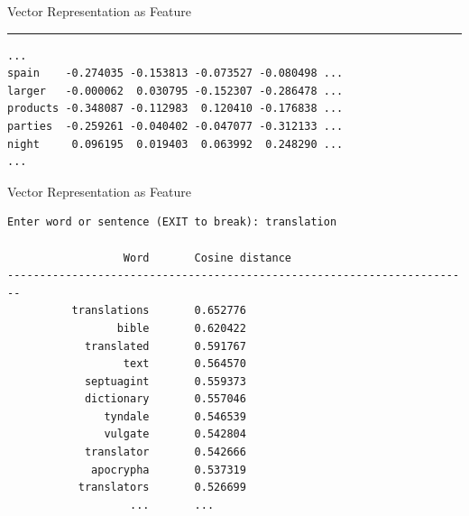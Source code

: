 \documentclass[18pt]{beamer}
\begin{document}
\begin{frame}[fragile]{Vector Representation as Feature}
\vspace{0.3cm}
\hrule
\begin{verbatim}
...
spain    -0.274035 -0.153813 -0.073527 -0.080498 ...
larger   -0.000062  0.030795 -0.152307 -0.286478 ...
products -0.348087 -0.112983  0.120410 -0.176838 ...
parties  -0.259261 -0.040402 -0.047077 -0.312133 ...
night     0.096195  0.019403  0.063992  0.248290 ...
...
\end{verbatim}
       
\end{frame}

\begin{frame}[fragile]{Vector Representation as Feature}
\begin{verbatim}
Enter word or sentence (EXIT to break): translation

                  Word       Cosine distance
------------------------------------------------------------------------
          translations       0.652776
                 bible       0.620422
            translated       0.591767
                  text       0.564570
            septuagint       0.559373
            dictionary       0.557046
               tyndale       0.546539
               vulgate       0.542804
            translator       0.542666
             apocrypha       0.537319
           translators       0.526699
                   ...       ...
\end{verbatim}
\end{frame}
\end{document}
